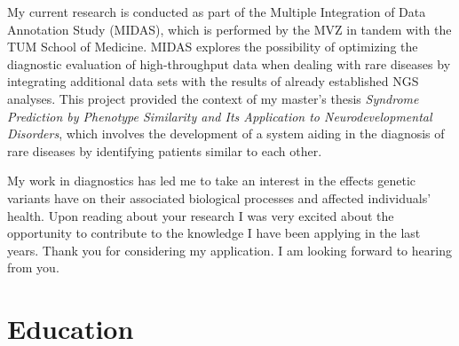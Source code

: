 \documentclass[11pt,a4paper,sans]{moderncv} %
\newcommand{\showcv}{}
\begin{document}
	My current research is conducted as part of the Multiple Integration of Data Annotation Study (MIDAS), which is performed by the MVZ in tandem with the TUM School of Medicine.
	MIDAS explores the possibility of optimizing the diagnostic evaluation of high-throughput data when dealing with rare diseases by integrating additional data sets with the results of already established NGS analyses.
	This project provided the context of my master's thesis \textit{Syndrome Prediction by Phenotype Similarity and Its Application to Neurodevelopmental Disorders}, which involves the development of a system aiding in the diagnosis of rare diseases by identifying patients similar to each other.	
	
	My work in diagnostics has led me to take an interest in the effects genetic variants have on their associated biological processes and affected individuals' health.
	Upon reading about your research I was very excited about the opportunity to contribute to the knowledge I have been applying in the last years.
	Thank you for considering my application.
	I am looking forward to hearing from you.
	
	\makeletterclosing %
	
	
	\fi
	\ifdefined\showcv
	\newpage
	\makecvtitle %
	
	\vspace{-20pt}
	
	\section{Education}
	
	
\end{document}
